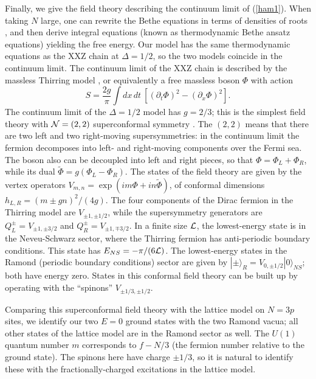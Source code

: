 \documentclass[a4paper,prl,aps,twocolumn]{revtex4}
\begin{document}
Finally, we give the field theory describing the continuum limit of
(\ref{ham1}).  When taking $N$ large, one can rewrite the Bethe equations
in terms of densities of roots \cite{Bethe}, and 
then derive integral equations (known as thermodynamic Bethe
ansatz equations) yielding the free energy. Our model has the same
thermodynamic equations as the XXZ chain at
$\Delta=1/2$, so the two models coincide in the continuum limit.  The
continuum limit of the XXZ chain is described by the massless
Thirring model \cite{hank}, or equivalently a free massless boson
$\Phi$ with action \cite{Friedan}
$$S=\frac{2g}{\pi}\int dx\,dt\ \left[(\partial_t \Phi)^2 -
(\partial_x\Phi)^2\right].$$ The continuum limit of the $\Delta=1/2$
model has $g=2/3$; this is the simplest field theory with ${\cal
N}=(2,2)$ superconformal symmetry \cite{Friedan}.  The $(2,2)$ means
that there are two left and two right-moving supersymmetries: in the
continuum limit the fermion decomposes into left- and right-moving
components over the Fermi sea. The boson also can be decoupled into
left and right pieces, so that $\Phi=\Phi_L + \Phi_R$, while its dual
$\widetilde\Phi=g(\Phi_L-\Phi_R)$.  The states of the field theory are
given by the vertex operators $V_{m,n}= \exp(im \Phi+i
n\widetilde{\Phi})$, of conformal dimensions $h_{L,R}=(m\pm g
n)^2/(4g)$. The four components of the Dirac fermion in the Thirring
model are $V_{\pm 1,\pm 1/2}$, while the supersymmetry generators are
$Q_L^\pm=V_{\pm 1, \pm 3/2}$ and $Q_R^\pm=V_{\pm 1, \mp 3/2}$.  In a
finite size ${\cal L}$, the lowest-energy state is in the
Neveu-Schwarz sector, where the Thirring fermion has anti-periodic
boundary conditions.  This state has $E_{NS}=-\pi/(6{\cal L})$. The
lowest-energy states in the Ramond (periodic boundary conditions)
sector are given by $|\pm\rangle_{R} = V_{0,\pm 1/2}|0\rangle_{NS}$;
both have energy zero. States in this conformal field theory can
be built up by operating with the ``spinons'' $V_{\pm 1/3,\pm 1/2}$.

Comparing this superconformal field theory with the lattice model on
$N=3p$ sites, we identify our two $E=0$ ground states with the two
Ramond vacua; all other states of the lattice model are in the Ramond
sector as well. The $U(1)$ quantum number $m$ corresponds to $f-N/3$
(the fermion number relative to the ground state).  The spinons here
have charge $\pm 1/3$, so it is natural to identify these with the
fractionally-charged excitations in the lattice model.
\end{document}
